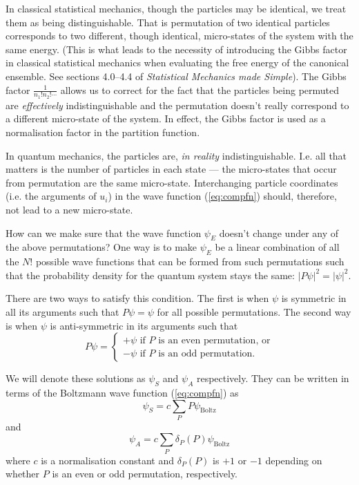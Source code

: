 \documentclass{article}
\begin{document}
In classical statistical mechanics, though the particles may be identical, we treat them as being distinguishable. That is permutation of two identical particles corresponds to two different, though identical, micro-states of the system with the same energy. (This is what leads to the necessity of introducing the Gibbs factor in classical statistical mechanics when evaluating the free energy of the canonical ensemble. See sections 4.0--4.4 of \emph{Statistical Mechanics made Simple}). The Gibbs factor $\frac{1}{n_1!n_2!\cdots}$ allows us to correct for the fact that the particles being permuted are \emph{effectively} indistinguishable and the permutation doesn't really correspond to a different micro-state of the system. In effect, the Gibbs factor is used as a normalisation factor in the partition function. 

In quantum mechanics, the particles are, \emph{in reality} indistinguishable. I.e. all that matters is the number of particles in each state --- the micro-states that occur from permutation are the same micro-state.
Interchanging particle coordinates (i.e. the arguments of $u_i$) in the wave function (\ref{eq:compfn}) should, therefore, not lead to a new micro-state.

How can we make sure that the wave function $\psi_E$ doesn't change under any of the above permutations? One way is to make $\psi_E$ be a linear combination of all the $N!$ possible wave functions that can be formed from such permutations such that the probability density for the quantum system stays the same: $|P\psi|^2=|\psi|^2$.

There are two ways to satisfy this condition. The first is when $\psi$ is symmetric in all its arguments such that $P\psi = \psi$ for all possible permutations. The second way is when $\psi$ is anti-symmetric in its arguments such that
$$
	P\psi = 
	\begin{cases}
		+\psi \text{ if $P$ is an even permutation, or}\\
		-\psi \text{ if $P$ is an odd permutation.}
	\end{cases}
$$

We will denote these solutions as $\psi_S$ and $\psi_A$ respectively. They can be written in terms of the Boltzmann wave function (\ref{eq:compfn}) as
$$
	\psi_S=c\sum_P P\psi_\text{Boltz}
$$
and
$$
	\psi_A=c\sum_P \delta_P(P)\psi_\text{Boltz}
$$
where $c$ is a normalisation constant and $\delta_P(P)$ is $+1$ or $-1$ depending on whether $P$ is an even or odd permutation, respectively.
\end{document}
